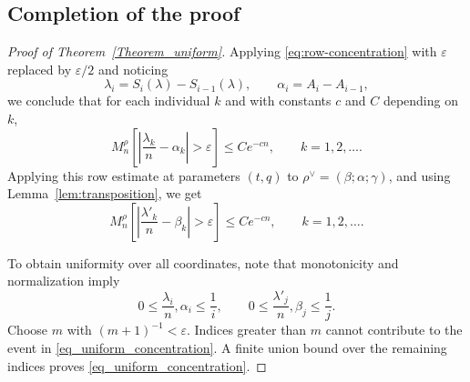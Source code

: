 \documentclass[11pt,reqno]{amsart}
\theoremstyle{definition}
\theoremstyle{remark}
\numberwithin{equation}{section}
\newcommand{\eps}{\varepsilon}
\begin{document}
\subsection{Completion of the proof}\label{sec:completion}
\begin{proof}[Proof of Theorem~\ref{Theorem_uniform}]
Applying \eqref{eq:row-concentration} with $\eps$ replaced by $\eps/2$ and noticing
\[
 \lambda_i=S_i(\lambda)-S_{i-1}(\lambda),\qquad
 \alpha_i=A_i-A_{i-1},
\]
we conclude that for each individual $k$ and with constants $c$ and $C$ depending on $k$,
$$
 M_n^\rho\left[\left|\frac{\lambda_k}n-\alpha_k\right|>\varepsilon\right]
 \le Ce^{-cn}, \qquad k=1,2,\dots.
$$
Applying this row estimate at parameters $(t,q)$ to
$\rho^\vee=(\beta;\alpha;\gamma)$, and using Lemma~\ref{lem:transposition}, we get
$$
 M_n^\rho\left[\left|\frac{\lambda'_k}n-\beta_k\right|>\varepsilon\right]
 \le Ce^{-cn}, \qquad k=1,2,\dots.
$$

To obtain uniformity over all coordinates, note that monotonicity and
normalization imply
\[
 0\le\frac{\lambda_i}{n},\alpha_i\le\frac1i,
 \qquad
 0\le\frac{\lambda'_j}{n},\beta_j\le\frac1j.
\]
Choose $m$ with $(m+1)^{-1}<\varepsilon$. Indices greater than $m$
cannot contribute to the event in \eqref{eq_uniform_concentration}.
A finite union bound over the remaining indices proves
\eqref{eq_uniform_concentration}.
\end{proof}
\end{document}
